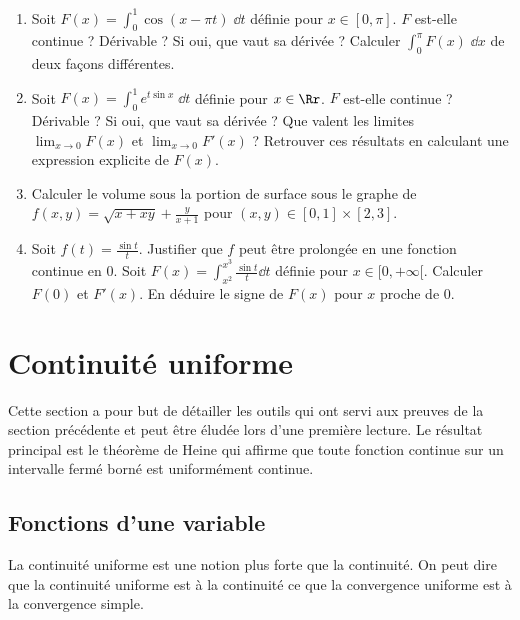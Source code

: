 \documentclass[class=report,crop=false]{standalone}
\begin{document}
\begin{miniexercices}

\begin{enumerate}
  \item Soit $F(x) = \int_0^1 \cos(x-\pi t) \; \dd t$ définie pour $x \in [0,\pi]$.
  $F$ est-elle continue ? Dérivable ? Si oui, que vaut sa dérivée ? Calculer 
  $\int_0^{\pi} F(x)\;\dd x$ de deux façons différentes.
  
  \item Soit $F(x) = \int_0^1 e^{t\sin x} \; \dd t$ définie pour $x \in \Rr$.
  $F$ est-elle continue ? Dérivable ? Si oui, que vaut sa dérivée ? 
  Que valent les limites $\lim_{x \to 0} F(x)$ et $\lim_{x \to 0} F'(x)$ ?
  Retrouver ces résultats en calculant une expression explicite de $F(x)$.
  
  \item Calculer le volume sous la portion de surface sous le graphe de 
  $f(x,y) = \sqrt{x+xy} + \frac{y}{x+1}$ pour $(x,y) \in [0,1] \times [2,3]$.
  
  \item Soit $f(t) = \frac{\sin t}{t}$. Justifier que $f$ peut être prolongée en une fonction continue
  en $0$. Soit $F(x) = \int_{x^2}^{x^3} \frac{\sin t}{t}\dd t$ définie pour $x\in[0,+\infty[$. 
  Calculer $F(0)$ et $F'(x)$. En déduire le signe de $F(x)$ pour $x$ proche de $0$.
\end{enumerate}
\end{miniexercices}



\section{Continuité uniforme}

Cette section a pour but de détailler les outils qui ont servi
aux preuves de la section précédente et peut être éludée lors d'une première lecture.
Le résultat principal est le théorème de Heine qui affirme que toute fonction continue 
sur un intervalle fermé borné est uniformément continue.



\subsection{Fonctions d'une variable}

La continuité uniforme est une notion plus forte que la continuité.
On peut dire que la continuité uniforme est à la continuité ce que la convergence
uniforme est à la convergence simple.
\end{document}
